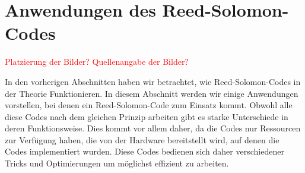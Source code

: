 %
%
%
\section{Anwendungen des Reed-Solomon-Codes
	\label{reedsolomon:section:anwendung}}
\textcolor{red}{Platzierung der Bilder? Quellenangabe der Bilder?}

In den vorherigen Abschnitten haben wir betrachtet, wie Reed-Solomon-Codes in der Theorie Funktionieren. 
In diesem Abschnitt werden wir einige Anwendungen vorstellen, bei denen ein Reed-Solomon-Code zum Einsatz kommt.
Obwohl alle diese Codes nach dem gleichen Prinzip arbeiten gibt es starke Unterschiede in deren Funktionsweise. 
Dies kommt vor allem daher, da die Codes nur Ressourcen zur Verfügung haben, die von der Hardware bereitstellt wird,  auf denen die Codes implementiert wurden.
Diese Codes bedienen sich daher verschiedener Tricks und Optimierungen um möglichst effizient zu arbeiten.
%
%
%
%
%
%
%
%
%
%
%
%
%
%

